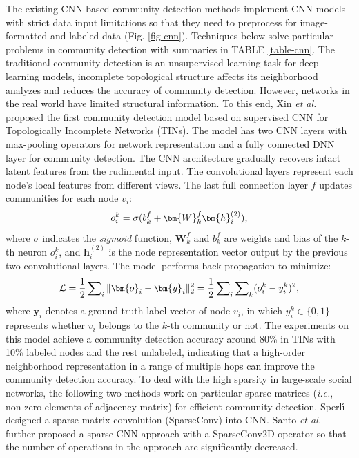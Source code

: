 \label{sec-model-cnn}
The existing CNN-based community detection methods implement CNN models with strict data input limitations so that they need to preprocess for image-formatted and labeled data (Fig. \ref{fig-cnn}). Techniques below solve particular problems in community detection with summaries in TABLE \ref{table-cnn}.
The traditional community detection is an unsupervised learning task for deep learning models, incomplete topological structure affects its neighborhood analyzes and reduces the accuracy of community detection. However, networks in the real world have limited structural information. To this end, Xin \textit{et al.}  proposed the first community detection model based on supervised CNN for Topologically Incomplete Networks (TINs). The model has two CNN layers with max-pooling operators for network representation and a fully connected DNN layer for community detection. The CNN architecture gradually recovers intact latent features from the rudimental input. The convolutional layers represent each node's local features from different views. The last full connection layer $f$ updates communities for each node $v_i$:
\begin{equation}
\small
o_i^k = \sigma(b_k^f + \bm{W}_k^f\bm{h}^{(2)}_i), 
\end{equation}
where $\sigma$ indicates the \textit{sigmoid} function, $\bm{W}_k^f$ and $b_k^f$ are weights and bias of the $k$-th neuron $o_i^k$, and $\bm{h}^{(2)}_i$ is the node representation vector output by the previous two convolutional layers. The model performs back-propagation to minimize:
\begin{equation}
\small
\mathcal{L} = \frac{1}{2}\sum\nolimits_i\|\bm{o}_i - \bm{y}_i\|_2^2 = \frac{1}{2}\sum\nolimits_i\sum\nolimits_k(o_i^k - y^k_i)^2, 
\end{equation}
where $\bm{y}_i$ denotes a ground truth label vector of node $v_i$, in which $y^k_i\in\{0,1\}$ represents whether $v_i$ belongs to the $k$-th community or not. The experiments on this model achieve a community detection accuracy around 80\% in TINs with 10\% labeled nodes and the rest unlabeled, indicating that a high-order neighborhood representation in a range of multiple hops can improve the community detection accuracy. 
To deal with the high sparsity in large-scale social networks, the following two methods work on particular sparse matrices (\textit{i.e.}, non-zero elements of adjacency matrix) for efficient community detection. Sperl{\'\i}  designed a sparse matrix convolution (SparseConv) into CNN. Santo \textit{et al.}  further proposed a sparse CNN approach with a SparseConv2D operator so that the number of operations in the approach are significantly decreased.

